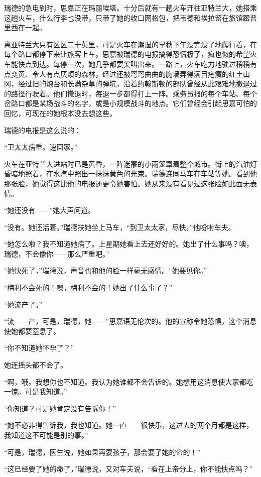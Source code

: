 \par 瑞德的急电到时，思嘉正在玛丽埃塔。十分后就有一趟火车开往亚特兰大，她搭乘这趟火车，什么行李也没带，只带了她的收口网格包，把韦德和埃拉留在旅馆跟普里西在一起。
\par 离亚特兰大只有区区二十英里，可是火车在潮湿的早秋下午没完没了地爬行着，在每个路口都停下来让旅客上车。思嘉被瑞德的电报搞得恐慌极了，疯也似的希望火车能快点到达。每停一次，她几乎都要尖叫出来。一路上，火车吃力地驶过稍稍有点变黄、令人有点厌烦的森林，经过还被弯弯曲曲的胸墙弄得满目疮痍的红土山冈，经过旧的炮台和长满杂草的弹坑，沿着约翰斯顿的部队曾经从此艰难地撤退过的路径行驶着。他们撤退时，每退一步都得打上一阵。乘务员报的每个车站、每个岔路口都是某场战斗的名字，或是小规模战斗的地点。它们曾经会引起思嘉可怕的回忆，可现在的她根本没去想这些。
\par 瑞德的电报是这么说的：
\par “卫太太病重。速回家。”
\par 火车在亚特兰大进站时已是黄昏，一阵迷蒙的小雨笼罩着整个城市。街上的汽油灯昏暗地照着，在水汽中照出一抹抹黄色的光束。瑞德连同马车在车站等她。看到他那张脸，她觉得这比他的电报还更令她害怕。她从来没有看见过这张脸如此面无表情。
\par “她还没有——”她大声问道。
\par “没有。她还活着。”瑞德扶她坐上马车，“到卫太太家，尽快，”他吩咐车夫。
\par “她怎么啦？我不知道她病了。上星期她看上去还好好的。她出了什么事吗？噢，瑞德，不会像你——那么严重吧。”
\par “她快死了，”瑞德说，声音也和他的脸一样毫无感情。“她要见你。”
\par “梅利不会死的！噢，梅利不会的！她出了什么事了？”
\par “她流产了。”
\par “流——产，可是，瑞德，她——”思嘉语无伦次的。他的宣称令她恐惧，这个消息使她都要窒息了。
\par “你不知道她怀孕了？”
\par 她连摇头都不会了。
\par “啊，哦。我想你也不知道。我认为她谁都不会告诉的。她想用这消息使大家都吃一惊。可是我知道。”
\par “你知道？可是她肯定没有告诉你！”
\par “她不必非得告诉我，我也知道。她一直——很快乐，这过去的两个月都是这样，我知道这不可能是别的事。”
\par “可是，瑞德，医生说，她如果再要孩子，那会要了她的命的！”
\par “这已经要了她的命了，”瑞德说，又对车夫说，“看在上帝分上，你不能快点吗？”
